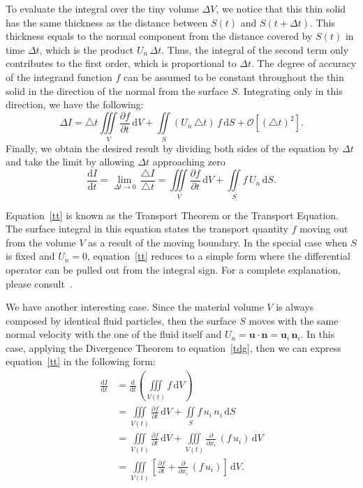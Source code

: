 \documentclass[12pt,a4paper]{report}
\begin{document}
To evaluate the integral over the tiny volume $\Delta V$, we notice that this thin solid has the same thickness as the distance between $S(t)$ and $S(t + \Delta t)$.
This thickness equals to the normal component from the distance covered by $S(t)$ in time $\Delta t$, which is the product $U_n \, \Delta t$.
Thus, the integral of the second term only contributes to the first order, which is proportional to $\Delta t$.
The degree of accuracy of the integrand function $f$ can be assumed to be constant throughout the thin solid in the direction of the normal from the surface $S$.
Integrating only in this direction, we have the following:
\begin{equation}
\Delta I = \triangle t \iiint\limits_{V} \frac{\partial f}{\partial t} \, \mathrm{d}V + \iint\limits_{S} (U_{n} \, \triangle t) \, f \, \mathrm{d}S + 
		   {\mathcal{O}} \left[(\triangle t)^2 \right].
\end{equation}
Finally, we obtain the desired result by dividing both sides of the equation by $\Delta t$ and take the limit by allowing $\Delta t$ approaching zero
\begin{equation}
\frac{\mathrm{d}I}{\mathrm{d}t} = \lim_{\Delta t \rightarrow 0} \, \frac{\triangle I}{\triangle t} = \iiint\limits_{V} \frac{\partial f}{\partial t} \, \mathrm{d}V + 
				\iint\limits_{S} f \, U_{n} \, \mathrm{d}S.  \label{tt}
\end{equation}

Equation~\eqref{tt} is known as the Transport Theorem or the Transport Equation.
The surface integral in this equation states the transport quantity $f$ moving out from the volume $V$ as a result of the moving boundary.
In the special case when $S$ is fixed and $U_n = 0$, equation~\eqref{tt} reduces to a simple form where the differential operator can be pulled out from the integral sign.
For a complete explanation, please consult~\cite{njn}.

We have another interesting case. Since the material volume $V$ is always composed by identical fluid particles, then the surface $S$ moves with the same normal velocity with the one of the fluid itself and $U_{n} = \mathbf{u} \cdot \mathbf{n} = \mathbf{u}_{i} \, \mathbf{n}_{i}$.
In this case, applying the Divergence Theorem to equation~\eqref{tdg}, then we can express equation~\eqref{tt} in the following form:
\begin{align}
\frac{\mathrm{d}I}{\mathrm{d}t} 
&= \frac{\mathrm{d}}{\mathrm{d}t} \left(\iiint\limits_{V(t)} f \, \mathrm{d}V \right) \nonumber \\
&= \iiint\limits_{V(t)} \frac{\partial f}{\partial t} \, \mathrm{d}V + \iint\limits_{S} f\, u_{i} \, n_{i} \, \mathrm{d}S \\
&= \iiint\limits_{V(t)} \frac{\partial f}{\partial t} \, \mathrm{d}V + \iiint\limits_{V(t)} \frac{\partial}{\partial x_{i}} \, \left(f \, u_{i} \right) \, \mathrm{d}V \\
&= \iiint\limits_{V(t)} \left[\frac{\partial f}{\partial t} + \frac{\partial}{\partial x_{i}} \, \left(f \, u_{i} \right) \right] \, \mathrm{d}V.  \label{fdv}
\end{align}
\end{document}
